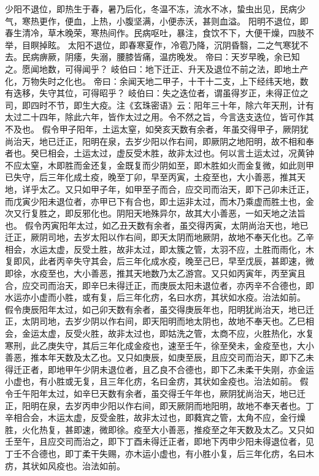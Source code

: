 \documentclass[a4paper,12pt,UTF8,twoside]{ctexbook}
\begin{document}
少阳不退位，即热生于春，暑乃后化，冬温不冻，流水不冰，蛰虫出见，民病少气，寒热更作，便血，上热，小腹坚满，小便赤沃，甚则血溢。
阳明不退位，即春生清冷，草木晚荣，寒热间作。民病呕吐，暴注，食饮不下，大便干燥，四肢不举，目瞑掉眩。
太阳不退位，即春寒夏作，冷雹乃降，沉阴昏翳，二之气寒犹不去。民病痹厥，阴痿，失溺，腰膝皆痛，温疠晚发。
帝曰：天岁早晚，余已知之。愿闻地数，可得闻乎？
岐伯曰：地下迁正、升天及退位不前之法，即地土产化，万物失时之化也。
帝曰：余闻天地二甲子，十干十二支，上下经纬天地，数有迭移，失守其位，可得昭乎？
岐伯曰：失之迭位者，谓虽得岁正，未得正位之司，即四时不节，即生大疫。注《玄珠密语》云：阳年三十年，除六年天刑，计有太过二十四年，除此六年，皆作太过之用。令不然之旨，今言迭支迭位，皆可作其不及也。
假令甲子阳年，土运太窒，如癸亥天数有余者，年虽交得甲子，厥阴犹尚治天，地已迁正，阳明在泉，去岁少阳以作右间，即厥阴之地阳明，故不相和奉者也。癸巳相会，土运太过，虚反受木胜，故非太过也。何以言土运太过，况黄钟不应太窒，木即胜而金还复，金既复而少阴如至，即木胜如火而金复微，如此则甲已失守，后三年化成土疫，晚至丁卯，早至丙寅，土疫至也，大小善恶，推其天地，详乎太乙。又只如甲子年，如甲至子而合，应交司而治天，即下己卯未迁正，而戊寅少阳未退位者，亦甲已下有合也，即土运非太过，而木乃乘虚而胜土也，金次又行复胜之，即反邪化也。阴阳天地殊异尔，故其大小善恶，一如天地之法旨也。
假令丙寅阳年太过，如乙丑天数有余者，虽交得丙寅，太阴尚治天也，地已迁正，厥阴司地，去岁太阳以作右间，即天太阴而地厥阴，故地不奉天化也。乙辛相会，水运太虚，反受土胜，故非太过，即太簇之管，太羽不应，土胜而雨化，木复即风，此者丙辛失守其会，后三年化成水疫，晚至己巳，早至戊辰，甚即速，微即徐，水疫至也，大小善恶，推其天地数乃太乙游宫。又只如丙寅年，丙至寅且合，应交司而治天，即辛巳未得迁正，而庚辰太阳未退位者，亦丙辛不合德也，即水运亦小虚而小胜，或有复，后三年化疠，名曰水疠，其状如水疫。治法如前。
假令庚辰阳年太过，如己卯天数有余者，虽交得庚辰年也，阳明犹尚治天，地已迁正，太阴司地，去岁少阴以作右间，即天阳明而地太阴也，故地不奉天也。乙巳相会，金运太虚，反受火胜，故非太过也，即姑洗之管，太商不应，火胜热化，水复寒刑，此乙庚失守，其后三年化成金疫也，速至壬午，徐至癸未，金疫至也，大小善恶，推本年天数及太乙也。又只如庚辰，如庚至辰，且应交司而治天，即下乙未得迁正者，即地甲午少阴未退位者，且乙良不合德也，即下乙未柔干失刚，亦金运小虚也，有小胜或无复，且三年化疠，名曰金疠，其状如金疫也。治法如前。
假令壬午阳年太过，如辛巳天数有余者，虽交得壬午年也，厥阴犹尚治天，地已迁正，阳明在泉，去岁丙申少阳以作右间，即天厥阴而地阳明，故地不奉天者也。丁辛相合会，木运太虚，反受金胜，故非太过也，即蕤宾之管，太角不应，金行燥胜，火化热复，甚即速，微即徐。疫至大小善恶，推疫至之年天数及太乙。又只如壬至午，且应交司而治之，即下丁酉未得迁正者，即地下丙申少阳未得退位者，见丁壬不合德也，即丁柔干失赐，亦木运小虚也，有小胜小复，后三年化疠，名曰木疠，其状如风疫也。治法如前。
\end{document}
